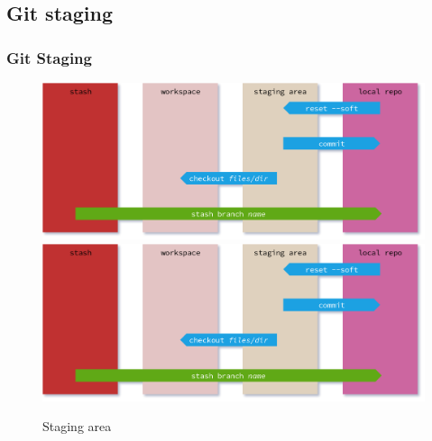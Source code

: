 \subsection*{Git staging}
\begin{frame}[fragile]
    \frametitle{Git Staging}
    \begin{figure}
        \begin{center}
            {
                \includegraphics[width=1\textwidth,keepaspectratio]{./images/GitAreas-Staging.png}
            }
            {
                \includegraphics[height=0.75\textheight,keepaspectratio]{./images/GitAreas-Staging.png}
            }
            \caption{Staging area}
        \end{center}
    \end{figure}
\end{frame}

